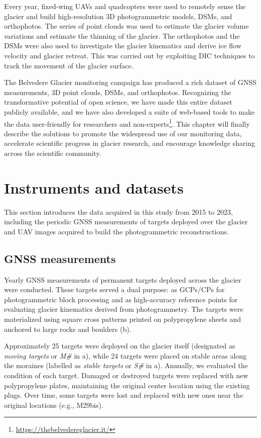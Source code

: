 Every year, fixed-wing UAVs and quadcopters were used to remotely sense the glacier and build high-resolution 3D photogrammetric models, DSMs, and orthophotos.
The series of point clouds was used to estimate the glacier volume variations and estimate the thinning of the glacier.
The orthophotos and the DSMs were also used to investigate the glacier kinematics and derive ice flow velocity and glacier retreat. 
This was carried out by exploiting DIC techniques to track the movement of the glacier surface.

The Belvedere Glacier monitoring campaign has produced a rich dataset of GNSS measurements, 3D point clouds, DSMs, and orthophotos. 
Recognizing the transformative potential of open science, we have made this entire dataset publicly available, and we have also developed a suite of web-based tools to make the data user-friendly for researchers and non-experts\footnote{\url{https://thebelvedereglacier.it/}}.
This chapter will finally describe the solutions to promote the widespread use of our monitoring data, accelerate scientific progress in glacier research, and encourage knowledge sharing across the scientific community.

\section{Instruments and datasets}\label{sec:3:instrument}
 
This section introduces the data acquired in this study from 2015 to 2023, including the periodic GNSS measurements of targets deployed over the glacier and UAV images acquired to build the photogrammetric reconstructions.

\subsection{GNSS measurements}\label{sec:3:gnss}

Yearly GNSS measurements of permanent targets deployed across the glacier were conducted. 
These targets served a dual purpose: as GCPs/CPs for photogrammetric block processing and as high-accuracy 
reference points for evaluating glacier kinematics derived from photogrammetry. 
The targets were materialized using square cross patterns printed on polypropylene sheets and anchored to 
large rocks and boulders (b).

Approximately 25 targets were deployed on the glacier itself (designated as \textit{moving targets} or 
\textit{M\#} in a), while 24 targets were placed on stable areas along the moraines 
(labelled as \textit{stable targets} or \textit{S\#} in a). 
Annually, we evaluated the condition of each target. 
Damaged or destroyed targets were replaced with new polypropylene plates, maintaining the original center location using the existing plugs. 
Over time, some targets were lost and replaced with new ones near the original locations (e.g., M29bis).

